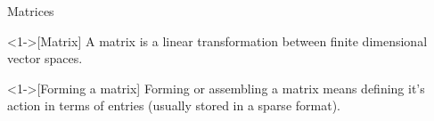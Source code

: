 \begin{frame}{Matrices}
  \begin{definition}<1->[Matrix]
    A \alert{matrix} is a linear transformation between finite dimensional vector spaces.
  \end{definition}
  \begin{definition}<1->[Forming a matrix]
    \alert{Forming} or \alert{assembling} a matrix means defining it's action in terms of entries (usually stored in a sparse format).
  \end{definition}
\end{frame}
